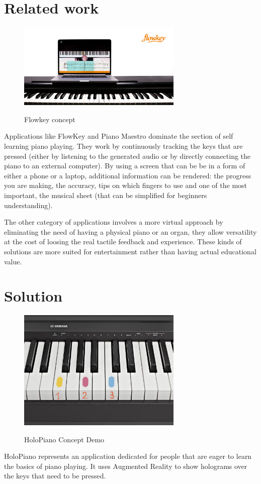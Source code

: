 \documentclass[12 pct]{report}
\begin{document}
\section{Related work}
\begin{figure}[H]
\includegraphics[width=0.7\textwidth]{flowkey}
\centering
\label{fig:hololens}
\caption{Flowkey concept}
\end{figure}

Applications like FlowKey and Piano Maestro dominate the section of self learning piano playing. They work by continuously tracking the keys that are pressed (either by listening to the generated audio or by directly connecting the piano to an external computer). By using a screen that can be be in a form of either a phone or a laptop, additional information can be rendered: the progress you are making, the accuracy, tips on which fingers to use and one of the most important, the musical sheet (that can be simplified for beginners understanding).


The other category of applications involves a more virtual approach by eliminating the need of having a physical piano or an organ, they allow versatility at the cost of loosing the real tactile feedback and experience. These kinds of solutions are more suited for entertainment rather than having actual educational value.

\section{Solution}
\begin{figure}[H]
\includegraphics[width=0.7\textwidth]{piano}
\centering
\label{fig:feature-points}
\caption{HoloPiano Concept Demo}
\end{figure}
HoloPiano represents an application dedicated for people that are eager to learn the basics of piano playing. It uses Augmented Reality to show holograms over the keys that need to be pressed.
\end{document}
